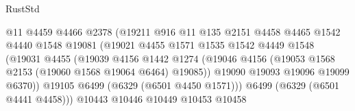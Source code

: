 \begin{lexlean}{RustStd}
\begin{coremodule}
{{                                        @11
                                        @4459
                                        @4466
                                        @2378
                                        (@19211
                                          @916
                                          @11
                                          @135
                                          @2151
                                          @4458
                                          @4465
                                          @1542
                                          @4440
                                          @1548
                                          @19081
                                          (@19021
                                            @4455
                                            @1571
                                            @1535
                                            @1542
                                            @4449
                                            @1548
                                            (@19031
                                              @4455
                                              (@19039
                                                @4156
                                                @1442
                                                @1274
                                                (@19046
                                                  @4156
                                                  (@19053
                                                    @1568
                                                    @2153
                                                    (@19060 @1568 @19064 @6464)
                                                    @19085))
                                                @19090
                                                @19093
                                                @19096
                                                @19099
                                                @6370))
                                            @19105
                                            @6499
                                            (@6329 (@6501 @4450 @1571)))
                                          @6499
                                          (@6329 (@6501 @4441 @4458)))
                                        @10443
                                        @10446
                                        @10449
                                        @10453
                                        @10458
}}
\end{coremodule}
\end{lexlean}
